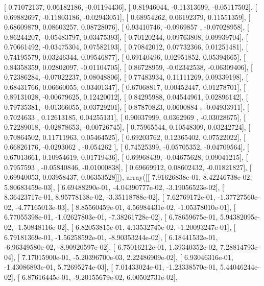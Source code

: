 \documentclass{article}
\begin{document}
       [ 0.71072137,  0.06182186, -0.01194436],
       [ 0.81946044, -0.11313699, -0.05117502],
       [ 0.69882697, -0.11803186, -0.02943051],
       [ 0.68954262,  0.06192379,  0.11551359],
       [ 0.68609879,  0.08603257,  0.08728076],
       [ 0.93410746, -0.0969857 , -0.07028958],
       [ 0.86244207, -0.05483797,  0.03475393],
       [ 0.70120244,  0.09763808,  0.09939704],
       [ 0.70661492, -0.03475304,  0.07582193],
       [ 0.70842012,  0.07732366,  0.01251481],
       [ 0.74195579,  0.03246344,  0.09546877],
       [ 0.69140496,  0.02951852,  0.05394665],
       [ 0.84358359,  0.02802097, -0.01104705],
       [ 0.86728959, -0.02342538, -0.06309406],
       [ 0.72386284, -0.07022237,  0.08048806],
       [ 0.77483934,  0.11111269,  0.09339198],
       [ 0.68431766,  0.06660055,  0.03401347],
       [ 0.67068817,  0.00452447,  0.01278701],
       [ 0.89131028, -0.00679625,  0.12420012],
       [ 0.84295988,  0.04544961,  0.02896142],
       [ 0.79735381, -0.01366055,  0.03729201],
       [ 0.87870823,  0.0600884 , -0.04933911],
       [ 0.7024633 ,  0.12613185,  0.04255131],
       [ 0.90037999,  0.0362969 , -0.03028675],
       [ 0.72289018, -0.02878653, -0.00726745],
       [ 0.75965544,  0.10548309,  0.03242724],
       [ 0.70864502,  0.11711963,  0.05464525],
       [ 0.69203762,  0.12365402,  0.07522022],
       [ 0.66826176, -0.0293062 , -0.054262  ],
       [ 0.74525399, -0.05705352, -0.04709564],
       [ 0.67013661,  0.10954619,  0.01719436],
       [ 0.69968439, -0.04675628,  0.09041215],
       [ 0.7957593 , -0.05840846, -0.01000838],
       [ 0.69669912,  0.08602432, -0.01821827],
       [ 0.69940053,  0.03958437,  0.06353528]]), array([[  7.91626838e-01,   8.42246738e-02,   5.80683459e-03],
       [  6.69488290e-01,  -4.04390777e-02,  -3.19056523e-02],
       [  8.36423717e-01,   8.95778138e-02,  -3.35118788e-02],
       [  7.62769172e-01,  -1.37727560e-02,  -4.77165013e-03],
       [  8.85560459e-01,   4.56984431e-02,  -1.05378010e-01],
       [  6.77055398e-01,  -1.02627803e-01,  -7.38261728e-02],
       [  6.78659675e-01,   5.94382095e-02,  -1.50848116e-02],
       [  6.82053815e-01,   4.13532745e-02,  -1.20093247e-01],
       [  6.79181369e-01,  -1.56258592e-01,  -8.90353244e-02],
       [  6.18441532e-01,  -6.96349580e-02,  -8.90920597e-02],
       [  6.75016212e-01,   1.39340352e-02,   7.28814793e-04],
       [  7.17015900e-01,  -5.20396700e-03,   2.22486909e-02],
       [  6.93046316e-01,  -1.43086893e-01,   5.72695274e-03],
       [  7.01433024e-01,  -1.23338570e-01,   5.44046244e-02],
       [  6.87616445e-01,  -9.20155679e-02,   6.00502731e-02],
\end{document}
